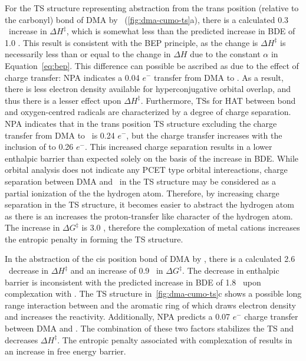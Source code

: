 For the TS structure representing abstraction from the trans position (relative
to the carbonyl)  bond of DMA by \cumo\ (\ref{fig:dma-cumo-ts}a), there
is a calculated 0.3 \kcalmol\ increase in $\Delta H^\ddagger$, which is
somewhat less than the predicted increase in BDE of 1.0 \kcalmol. This result
is consistent with the BEP principle, as the change is $\Delta H^\ddagger$ is
necessarily less than or equal to the change in $\Delta H$ due to the constant
$\alpha$ in Equation~\ref{eq:bep}. This difference can possible be ascribed as
due to the effect of charge transfer: NPA indicates a 0.04 $e^-$ transfer from
DMA to . As a result, there is less electron density available for
hyperconjugative orbital overlap, and thus there is a lesser effect upon
$\Delta H^\ddagger$.  Furthermore, TSs for HAT between  bond and
oxygen-centred radicals are characterized by a degree of charge
separation.\cite{Roberts1999} NPA indicates that in the trans position TS
structure excluding  the charge transfer from DMA to \cumo\ is 0.24
$e^-$, but the charge transfer increases with the inclusion of  to
0.26 $e^-$. This increased charge separation results in a lower enthalpic
barrier than expected solely on the basis of the increase in  BDE.
While orbital analysis does not indicate any PCET type orbital intereactions,
charge separation between DMA and \cumo\ in the TS structure may be considered
as a partial ionization of the the hydrogen atom. Therefore, by increasing
charge separation in the TS structure, it becomes easier to abstract the
hydrogen atom as there is an increases the proton-transfer like character of
the hydrogen atom. The increase in $\Delta G^\ddagger$ is 3.0 \kcalmol,
therefore the complexation of metal cations increases the entropic penalty in
forming the TS structure.

In the abstraction of the cis position  bond of DMA by \cumo, there is
a calculated 2.6 \kcalmol\ decrease in $\Delta H^\ddagger$ and an increase of
0.9 \kcalmol\ in $\Delta G^\ddagger$. The decrease in enthalpic barrier is
inconsistent with the predicted increase in BDE of 1.8 \kcalmol\ upon
complexation with . The TS structure in~\ref{fig:dma-cumo-ts}c shows a
possible long range interaction between  and the aromatic ring of
\cumo which draws electron density and increases the reactivity. Additionally,
NPA predicts a 0.07 $e^-$ charge transfer between DMA and . The
combination of these two factors stabilizes the TS and decreases $\Delta
H^\ddagger$. The entropic penalty associated with complexation of 
results in an increase in free energy barrier.

